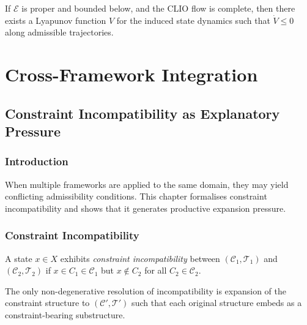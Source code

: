 \documentclass[11pt,openany]{book}
\begin{document}
\begin{proposition}
\label{prop:clio-lyapunov}
If $\mathcal{E}$ is proper and bounded below, and the CLIO
flow is complete, then there exists a Lyapunov function $V$
for the induced state dynamics such that $\dot{V} \le 0$
along admissible trajectories.
\end{proposition}



\part{Cross-Framework Integration}

\chapter{Constraint Incompatibility as Explanatory Pressure}
\label{ch:incompatibility}

\section{Introduction}
\label{sec:introduction-incompatibility}

When multiple frameworks are applied to the same domain,
they may yield conflicting admissibility conditions. This
chapter formalises constraint incompatibility and shows
that it generates productive expansion pressure.

\section{Constraint Incompatibility}
\label{sec:definition-incompatibility}

\begin{definition}
\label{def:incompatibility}
A state $x \in X$ exhibits \emph{constraint
incompatibility} between $(\mathcal{C}_1, \mathcal{T}_1)$
and $(\mathcal{C}_2, \mathcal{T}_2)$ if $x \in C_1 \in
\mathcal{C}_1$ but $x \notin C_2$ for all $C_2 \in
\mathcal{C}_2$.
\end{definition}

\begin{proposition}
\label{prop:expansion}
The only non-degenerative resolution of incompatibility is
expansion of the constraint structure to $(\mathcal{C}',
\mathcal{T}')$ such that each original structure embeds as
a constraint-bearing substructure.
\end{proposition}
\end{document}
